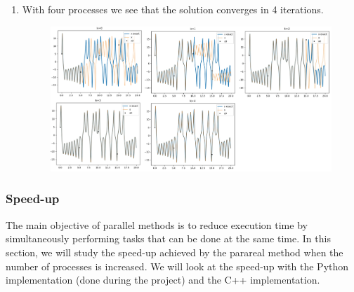 \begin{enumerate}[label=\textbullet]
\begin{enumerate}[label=-]
		\newpage
		\item With four processes we see that the solution converges in 4 iterations.
		\begin{figure}[H]      
			\qquad \qquad
			\includegraphics[width=0.7\linewidth]{"images/parareal/cpp/lorenz_4p.jpg"}
			\label{lorenz:4}
		\end{figure}
	
	\end{enumerate}

\end{enumerate}

\subsubsection{Speed-up}

The main objective of parallel methods is to reduce execution time by simultaneously performing tasks that can be done at the same time. In this section, we will study the speed-up achieved by the parareal method when the number of processes is increased. We will look at the speed-up with the Python implementation (done during the project) and the C++ implementation.

